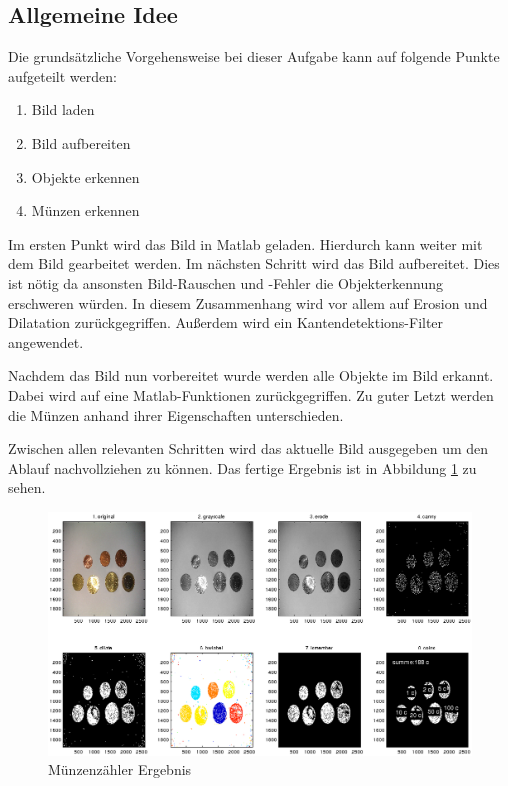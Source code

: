 \documentclass[a4paper,DIV=calc,ngerman]{scrartcl}
\begin{document}
\subsection{Allgemeine Idee}
\label{sec:a1idee}
Die grundsätzliche Vorgehensweise bei dieser Aufgabe kann auf folgende Punkte aufgeteilt werden:

\begin{enumerate}
    \item Bild laden
    \item Bild aufbereiten
    \item Objekte erkennen
    \item Münzen erkennen
\end{enumerate}

Im ersten Punkt wird das Bild in Matlab geladen. Hierdurch kann weiter mit dem Bild gearbeitet werden. Im nächsten Schritt wird das Bild aufbereitet. Dies ist nötig da ansonsten Bild-Rauschen und -Fehler die Objekterkennung erschweren würden. In diesem Zusammenhang wird vor allem auf Erosion und Dilatation zurückgegriffen. Außerdem wird ein Kantendetektions-Filter angewendet.

Nachdem das Bild nun vorbereitet wurde werden alle Objekte im Bild erkannt. Dabei wird auf eine Matlab-Funktionen zurückgegriffen. Zu guter Letzt werden die Münzen anhand ihrer Eigenschaften unterschieden.

Zwischen allen relevanten Schritten wird das aktuelle Bild ausgegeben um den Ablauf nachvollziehen zu können. Das fertige Ergebnis ist in Abbildung \ref{fig:coincountresult} zu sehen.


\begin{figure}
\centering
\includegraphics[width=14cm]{coin_count_result2}
\caption{Münzenzähler Ergebnis}
\label{fig:coincountresult}
\end{figure}
\end{document}
